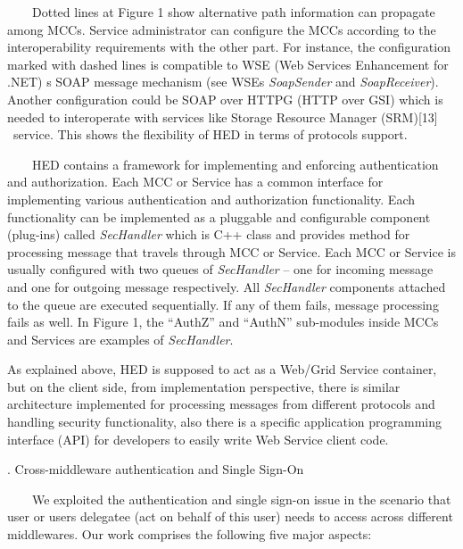\documentclass{article}
\begin{document}
\ \ \ \ Dotted lines at Figure 1 show alternative path information can
propagate among MCCs. Service administrator can configure the MCCs
according to the interoperability requirements with the other part. For
instance, the configuration marked with dashed lines is compatible to
WSE (Web Services Enhancement for .NET) {\textquotesingle}s SOAP
message mechanism (see WSE{\textquotesingle}s \textit{SoapSender} and
\textit{SoapReceiver}). Another configuration could be SOAP over HTTPG
(HTTP over GSI) which is needed to interoperate with services like
Storage Resource Manager (SRM)[13] \ service. This shows the
flexibility of HED in terms of protocols support.

\ \ \ \ HED contains a framework for implementing and enforcing
authentication and authorization. Each MCC or Service has a common
interface for implementing various authentication and authorization
functionality. Each functionality can be implemented as a pluggable and
configurable component (plug-ins) called \textit{SecHandler} which is
C++ class and provides method for processing message that travels
through MCC or Service. Each MCC or Service is usually configured with
two queues of \textit{SecHandler} -- one for incoming message and one
for outgoing message respectively. All \textit{SecHandler} components
attached to the queue are executed sequentially. If any of them fails,
message processing fails as well. In Figure 1, the
{\textquotedblleft}AuthZ{\textquotedblright} and
{\textquotedblleft}AuthN{\textquotedblright} sub-modules inside MCCs
and Services are examples of \textit{SecHandler}.

As explained above, HED is supposed to act as a Web/Grid Service
container, but on the client side, from implementation perspective,
there is similar architecture implemented for processing messages from
different protocols and handling security functionality, also there is
a specific application programming interface (API) for developers to
easily write Web Service client code.


\bigskip

{. Cross-middleware authentication and Single Sign-On
\par}

\ \ \ \ We exploited the authentication and single sign-on issue in the
scenario that user or user{\textquotesingle}s delegatee (act on behalf
of this user) needs to access across different middlewares. Our work
comprises the following five major aspects:
\end{document}
